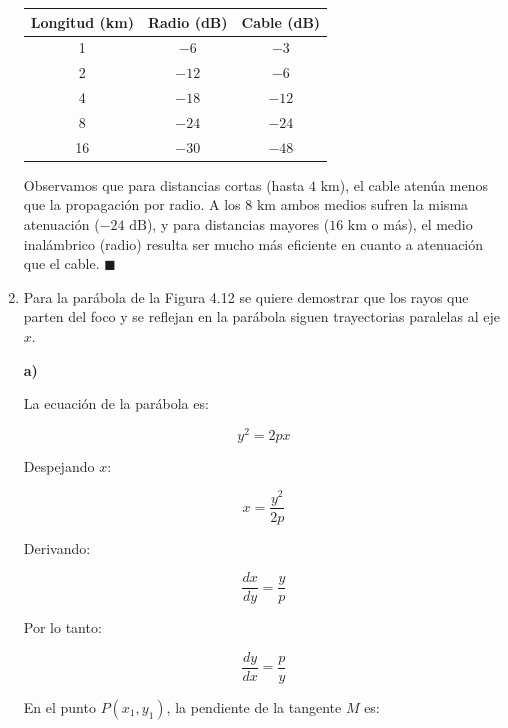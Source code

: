\documentclass[11pt,a4paper]{article}
\begin{document}
\begin{enumerate}[label=4.\arabic*), itemsep=0.3cm]
        \begin{table}[h!]
          \centering
          \begin{tabular}{ccc}
            \toprule
            \textbf{Longitud (km)} & \textbf{Radio (dB)} & \textbf{Cable (dB)} \\
            \midrule
            1                      & $-6$                & $-3$                \\
            2                      & $-12$               & $-6$                \\
            4                      & $-18$               & $-12$               \\
            8                      & $-24$               & $-24$               \\
            16                     & $-30$               & $-48$               \\
            \bottomrule
          \end{tabular}

        \end{table}

        Observamos que para distancias cortas (hasta $4\text{ km}$), el cable atenúa menos que la propagación por radio. A los $8\text{ km}$ ambos medios sufren la misma atenuación ($-24\text{ dB}$), y para distancias mayores ($16\text{ km}$ o más), el medio inalámbrico (radio) resulta ser mucho más eficiente en cuanto a atenuación que el cable. \quad $\blacksquare$

  \item Para la parábola de la Figura 4.12 se quiere demostrar
        que los rayos que parten del foco y se reflejan en la parábola siguen
        trayectorias paralelas al eje \(x\).

        \textbf{a)}

        La ecuación de la parábola es:

        \[
          y^2=2px
        \]

        Despejando \(x\):

        \[
          x=\frac{y^2}{2p}
        \]

        Derivando:

        \[
          \frac{dx}{dy}=\frac{y}{p}
        \]

        Por lo tanto:

        \[
          \frac{dy}{dx}=\frac{p}{y}
        \]

        En el punto \(P(x_1,y_1)\), la pendiente de la tangente \(M\) es:


\end{enumerate}
\end{document}
